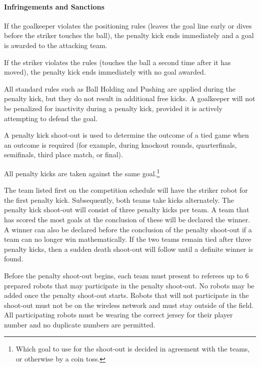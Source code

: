 \paragraph{Infringements and Sanctions}

If the goalkeeper violates the positioning rules (leaves the goal line early or dives before the striker touches the ball), the penalty kick ends immediately and a goal is awarded to the attacking team.

If the striker violates the rules (touches the ball a second time after it has moved), the penalty kick ends immediately with no goal awarded.

All standard rules such as Ball Holding and Pushing are applied during the penalty kick, but they do not result in additional free kicks. A goalkeeper will not be penalized for inactivity during a penalty kick, provided it is actively attempting to defend the goal.

\label{sec:penalty_shoot_out}

A penalty kick shoot-out is used to determine the outcome of a tied game when an outcome is required (for example, during knockout rounds, quarterfinals, semifinals, third place match, or final).

All penalty kicks are taken against the same goal.\footnote{Which goal to use for the shoot-out is decided in agreement with the teams, or otherwise by a coin toss.}

The team listed first on the competition schedule will have the striker robot for the first penalty kick. Subsequently, both teams take kicks alternately. The penalty kick shoot-out will consist of three penalty kicks per team. A team that has scored the most goals at the conclusion of these will be declared the winner. A winner can also be declared before the conclusion of the penalty shoot-out if a team can no longer win mathematically. If the two teams remain tied after three penalty kicks, then a sudden death shoot-out will follow until a definite winner is found.

Before the penalty shoot-out begins, each team must present to referees up to 6 prepared robots that may participate in the penalty shoot-out. No robots may be added once the penalty shoot-out starts. Robots that will not participate in the shoot-out must not be on the wireless network and must stay outside of the field. All participating robots must be wearing the correct jersey for their player number and no duplicate numbers are permitted.

